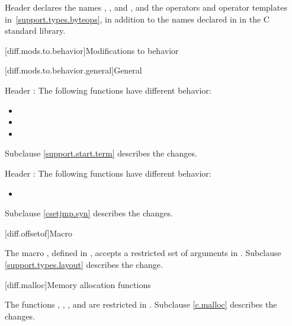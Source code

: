 \pnum
Header 
declares the names , , and ,
and the operators and operator templates in~\ref{support.types.byteops},
in addition to the names declared in
 in the C standard library.

[diff.mods.to.behavior]{Modifications to behavior}

[diff.mods.to.behavior.general]{General}

\pnum
Header :
The following functions have different behavior:

\begin{itemize}
\item {}
\item {}
\item {}
\end{itemize}

Subclause \ref{support.start.term} describes the changes.

\pnum
Header :
The following functions have different behavior:
\begin{itemize}
\item {}
\end{itemize}

Subclause \ref{csetjmp.syn} describes the changes.

[diff.offsetof]{Macro }
%

\pnum
The macro , defined in
,
accepts a restricted set of  arguments in \Cpp{}.
Subclause \ref{support.types.layout} describes the change.

[diff.malloc]{Memory allocation functions}

\pnum
The functions
,
,
,
and
are restricted in \Cpp{}.
Subclause \ref{c.malloc} describes the changes.

